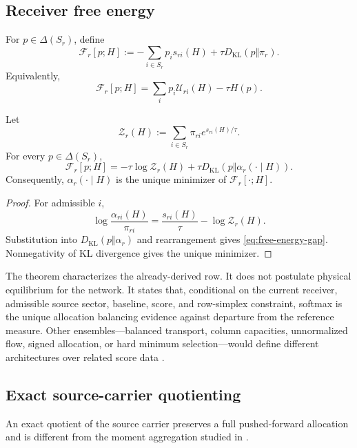 \subsection{Receiver free energy}\label{subsec:free-energy}

For $p\in\Delta(S_r)$, define
\begin{equation}\label{eq:receiver-free-energy}
\mathcal F_r[p;H]
:=-\sum_{i\in S_r}p_i s_{ri}(H)
+\tau D_{\mathrm{KL}}(p\Vert\pi_r).
\end{equation}
Equivalently,
\[
\mathcal F_r[p;H]
=
\sum_ip_i\mathcal U_{ri}(H)-\tau H(p).
\]

\begin{theorem}\label{thm:receiver-free-energy}
Let
\[
\mathcal Z_r(H):=\sum_{i\in S_r}\pi_{ri}e^{s_{ri}(H)/\tau}.
\]
For every $p\in\Delta(S_r)$,
\begin{equation}\label{eq:free-energy-gap}
\boxed{
\mathcal F_r[p;H]
=
-\tau\log\mathcal Z_r(H)
+\tau D_{\mathrm{KL}}\!\left(p\Vert\alpha_r(\cdot\mid H)\right).
}
\end{equation}
Consequently, $\alpha_r(\cdot\mid H)$ is the unique minimizer of $\mathcal F_r[\cdot;H]$.
\end{theorem}

\begin{proof}
For admissible $i$,
\[
\log\frac{\alpha_{ri}(H)}{\pi_{ri}}
=\frac{s_{ri}(H)}{\tau}-\log\mathcal Z_r(H).
\]
Substitution into $D_{\mathrm{KL}}(p\Vert\alpha_r)$ and rearrangement gives \eqref{eq:free-energy-gap}. Nonnegativity of KL divergence gives the unique minimizer.
\end{proof}

The theorem characterizes the already-derived row. It does not postulate physical equilibrium for the network. It states that, conditional on the current receiver, admissible source sector, baseline, score, and row-simplex constraint, softmax is the unique allocation balancing evidence against departure from the reference measure. Other ensembles---balanced transport, column capacities, unnormalized flow, signed allocation, or hard minimum selection---would define different architectures over related score data \citep{cuturi2013sinkhorn}.

\subsection{Exact source-carrier quotienting}\label{subsec:coarse-potential}

An exact quotient of the source carrier preserves a full pushed-forward allocation and is different from the moment aggregation studied in .

